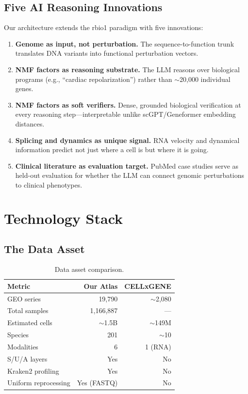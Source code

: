 \documentclass[10pt,twocolumn,letterpaper]{article}
\begin{document}
\subsection{Five AI Reasoning Innovations}

Our architecture extends the rbio1 paradigm with five innovations:
\begin{enumerate}
  \item \textbf{Genome as input, not perturbation.} The sequence-to-function trunk
    translates DNA variants into functional perturbation vectors.
  \item \textbf{NMF factors as reasoning substrate.} The LLM reasons over
    biological programs (e.g., ``cardiac repolarization'') rather than
    $\sim$20,000 individual genes.
  \item \textbf{NMF factors as soft verifiers.} Dense, grounded biological
    verification at every reasoning step---interpretable unlike scGPT/Geneformer
    embedding distances.
  \item \textbf{Splicing and dynamics as unique signal.} RNA velocity and
    dynamical information predict not just where a cell is but where it is going.
  \item \textbf{Clinical literature as evaluation target.} PubMed case studies
    serve as held-out evaluation for whether the LLM can connect genomic
    perturbations to clinical phenotypes.
\end{enumerate}

\section{Technology Stack}
\label{sec:technology}

\subsection{The Data Asset}

\begin{table}[h]
\centering
\small
\begin{tabular}{@{}lrr@{}}
\toprule
\textbf{Metric} & \textbf{Our Atlas} & \textbf{CELLxGENE} \\
\midrule
GEO series & 19,790 & $\sim$2,080 \\
Total samples & 1,166,887 & --- \\
Estimated cells & $\sim$1.5B & $\sim$149M \\
Species & 201 & $\sim$10 \\
Modalities & 6 & 1 (RNA) \\
S/U/A layers & Yes & No \\
Kraken2 profiling & Yes & No \\
Uniform reprocessing & Yes (FASTQ) & No \\
\bottomrule
\end{tabular}
\caption{Data asset comparison.}
\label{tab:data_comparison}
\end{table}
\end{document}
